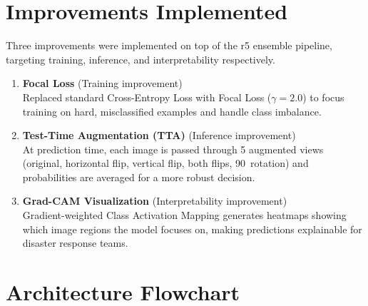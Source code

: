 \documentclass[11pt]{article}
\begin{document}
\section{Improvements Implemented}

Three improvements were implemented on top of the r5 ensemble pipeline, targeting training, inference, and interpretability respectively.

\begin{enumerate}
    \item \textbf{Focal Loss} (Training improvement) \\
          Replaced standard Cross-Entropy Loss with Focal Loss ($\gamma = 2.0$) to focus training on hard, misclassified examples and handle class imbalance.

    \item \textbf{Test-Time Augmentation (TTA)} (Inference improvement) \\
          At prediction time, each image is passed through 5 augmented views (original, horizontal flip, vertical flip, both flips, 90\textdegree\ rotation) and probabilities are averaged for a more robust decision.

    \item \textbf{Grad-CAM Visualization} (Interpretability improvement) \\
          Gradient-weighted Class Activation Mapping generates heatmaps showing which image regions the model focuses on, making predictions explainable for disaster response teams.
\end{enumerate}

\section{Architecture Flowchart}
\end{document}
